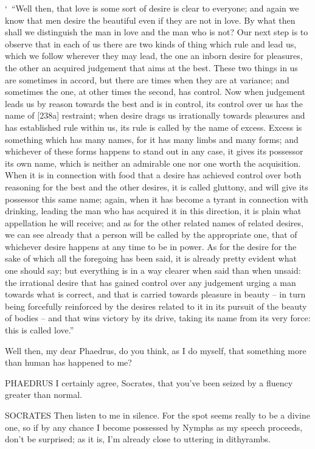 ‘~“Well then, that love is some sort of
desire is clear to
everyone; and again we know that men desire the
beautiful  even
if they are not in love. By what then shall we distinguish the man in
love and the man who is not? Our next step is to observe that in each of
us there are two kinds of thing which rule and lead us, which we follow
wherever they may lead, the one an inborn desire for pleasures, the
other an acquired judgement that aims at the best. These two things in
us are sometimes in accord, but there are times when they are at
 variance; and sometimes the one, at other times the second, has
control. Now when judgement leads us by reason towards the best and is
in control, its control over us has the name of {[}238a{]}
restraint; when desire
drags us irrationally towards pleasures and has established rule within
us, its rule is called by the name of
excess. Excess is
something which has many names, for it has many limbs and many forms;
and whichever of these forms  happens to stand out in any case,
it gives its possessor its own name, which is neither an admirable one
nor one worth the acquisition. When it is in connection with food that a
desire has achieved control over both reasoning for the best and the
 other desires, it is called gluttony, and will give its
possessor this same name; again, when it has become a tyrant in
connection with drinking, leading the man who has acquired it in this
direction, it is plain what appellation he will receive; and as
for the other related names of related desires, we can see
already that a person will be called by the appropriate one, that of
whichever desire happens at any time to be in power. As for the desire
for the sake of which all the foregoing has been said, it is already
pretty evident what one should say; but everything is in a way clearer
when said than when unsaid: the irrational desire that has gained
control over any judgement urging a man  towards what is
correct, and that is carried towards pleasure in beauty -- in turn being
forcefully reinforced by the desires related to it in its pursuit of the
beauty of bodies -- and that wins victory by its drive, taking its name
from its very force: this is called
love.”

 Well then, my dear Phaedrus, do you think, as I do myself, that
something more than
human has happened to
me?

PHAEDRUS I certainly agree, Socrates, that you've been seized by a
fluency greater than normal.

SOCRATES Then listen to me in silence. For the spot seems 
really to be a divine one, so if by any chance I become possessed by
Nymphs as my speech proceeds, don't be surprised; as it is, I'm already
close to uttering in
dithyrambs.

